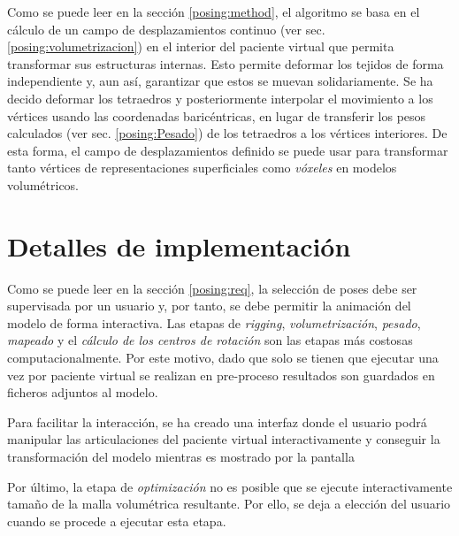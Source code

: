 Como se puede leer en la sección 
\ref{posing:method}, el algoritmo se basa en el cálculo de un campo de desplazamientos continuo (ver sec. \ref{posing:volumetrizacion}) %
en el interior del paciente virtual que permita transformar sus estructuras internas. Esto permite deformar los tejidos de forma independiente y, aun así, garantizar que estos se muevan solidariamente. Se ha decido deformar los tetraedros y posteriormente interpolar el movimiento a los vértices usando las coordenadas baricéntricas, en lugar de transferir los pesos calculados (ver sec. \ref{posing:Pesado}) de los tetraedros a los vértices interiores. 
De esta forma, el campo de desplazamientos definido se puede usar para transformar tanto vértices de representaciones superficiales como \emph{vóxeles} en modelos volumétricos. 





\section{Detalles de implementación}
\label{posing:preprocess}

Como se puede leer en la sección \ref{posing:req}, la selección de poses debe ser supervisada por un usuario y, por tanto, se debe permitir la animación del modelo de forma interactiva. 
Las etapas de \emph{rigging}, \emph{volumetrización}, \emph{pesado}, \emph{mapeado} y el \emph{cálculo de los centros de rotación} son las etapas más costosas computacionalmente. 
Por este motivo, dado que solo se tienen que ejecutar una vez por paciente virtual\new{,} se realizan en pre-proceso   resultados son guardados en ficheros adjuntos al modelo. 

Para facilitar la interacción, se ha creado una interfaz donde el usuario podrá manipular las articulaciones del paciente virtual\new{,} interactivamente y conseguir la transformación del modelo mientras es mostrado por la pantalla 

Por último, la etapa de \emph{optimización} no es posible que se ejecute interactivamente   tamaño de la malla volumétrica resultante. Por ello, se deja a elección del usuario cuando se procede a ejecutar esta etapa.


